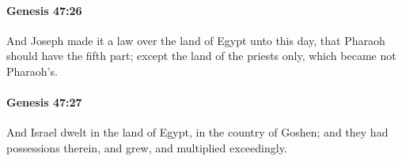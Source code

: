 		\paragraph{Genesis 47:26} %
			\label{GENESIS-47-26}

			And Joseph made it a law over the land of Egypt unto this day, that Pharaoh should have the fifth part; except the land of the priests only, which became not Pharaoh's.


		\paragraph{Genesis 47:27} %
			\label{GENESIS-47-27}

			And Israel dwelt in the land of Egypt, in the country of Goshen; and they had possessions therein, and grew, and multiplied exceedingly.


